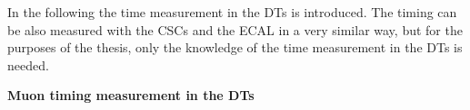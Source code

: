 In the following the time measurement in the DTs is introduced. The timing can be also measured with the CSCs and the ECAL in a very similar way, but for the purposes of the thesis, only the knowledge of the time measurement in the DTs is needed.


\textbf{Muon timing measurement in the DTs~\label{sec:muonTiming}}


